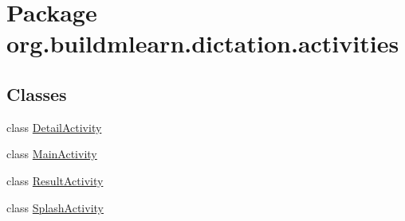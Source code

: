 \hypertarget{namespaceorg_1_1buildmlearn_1_1dictation_1_1activities}{}\section{Package org.\+buildmlearn.\+dictation.\+activities}
\label{namespaceorg_1_1buildmlearn_1_1dictation_1_1activities}
\subsection*{Classes}
\begin{DoxyCompactItemize}
\item 
class \hyperlink{classorg_1_1buildmlearn_1_1dictation_1_1activities_1_1DetailActivity}{Detail\+Activity}
\item 
class \hyperlink{classorg_1_1buildmlearn_1_1dictation_1_1activities_1_1MainActivity}{Main\+Activity}
\item 
class \hyperlink{classorg_1_1buildmlearn_1_1dictation_1_1activities_1_1ResultActivity}{Result\+Activity}
\item 
class \hyperlink{classorg_1_1buildmlearn_1_1dictation_1_1activities_1_1SplashActivity}{Splash\+Activity}
\end{DoxyCompactItemize}
